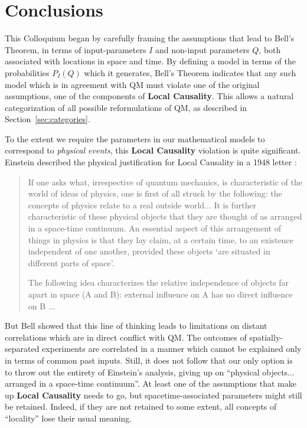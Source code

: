 \documentclass[rmp, aps, preprint, longbibliography]{revtex4-1}
\begin{document}
\section{Conclusions}

This Colloquium began by carefully framing the assumptions that lead to Bell's Theorem, in terms of input-parameters $I$ and non-input parameters $Q$, both associated with locations in space and time.  By defining a model in terms of the probabilities $P_I(Q)$ which it generates, Bell's Theorem indicates that any such model which is in agreement with QM must violate one of the original assumptions, one of the components of {\bf Local Causality}.  This allows a natural categorization of all possible reformulations of QM, as described in Section~\ref{sec:categories}.  

To the extent we require the parameters in our mathematical models to correspond to \emph{physical events}, this {\bf Local Causality} violation is quite significant.  Einstein described the physical justification for Local Causality in a 1948 letter \cite{born1971}:
\begin{quote}
If one asks what, irrespective of quantum mechanics, is characteristic of the world of ideas of physics, one is first of all struck by the following: the concepts of physics relate to a real outside world...  It is further characteristic of these physical objects that they are thought of as arranged in a space-time continuum. An essential aspect of this arrangement of things in physics is that they lay claim, at a certain time, to an existence independent of one another, provided these objects `are situated in different parts of space'.

The following idea characterizes the relative independence of objects far apart in space (A and B): external influence on A has no direct influence on B ...
\end{quote}

But Bell showed that this line of thinking leads to limitations on distant correlations which are in direct conflict with QM\@.  The outcomes of spatially-separated experiments are correlated in a manner which cannot be explained only in terms of common past inputs.  Still, it does not follow that our only option is to throw out the entirety of Einstein's analysis, giving up on ``physical objects... arranged in a space-time continuum''.  At least one of the assumptions that make up {\bf Local Causality} needs to go, but spacetime-associated parameters might still be retained.  Indeed, if they are not retained to some extent, all concepts of ``locality'' lose their usual meaning.
\end{document}

